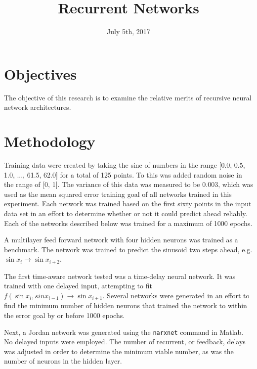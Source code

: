 \documentclass{IEEEtran}
\begin{document}
\title{Recurrent Networks}
\author{
}
\date{July 5th, 2017}

\maketitle

\section{Objectives\label{sn:objectives}}
The objective of this research is to examine the relative merits of recursive neural network architectures.

\section{Methodology\label{sn:methodology}}
Training data were created by taking the sine of numbers in the range [0.0, 0.5, 1.0, ..., 61.5, 62.0] for a total of 125 points. To this was added random noise in the range of [0, 1]. The variance of this data was measured to be 0.003, which was used as the mean squared error training goal of all networks trained in this experiment. Each network was trained based on the first sixty points in the input data set in an effort to determine whether or not it could predict ahead reliably. Each of the networks described below was trained for a maximum of 1000 epochs.

A multilayer feed forward network with four hidden neurons was trained as a benchmark. The network was trained to predict the sinusoid two steps ahead, e.g. $ \sin{x_i} \rightarrow \sin{x_{i+2}} $.

The first time-aware network tested was a time-delay neural network. It was trained with one delayed input, attempting to fit $ f\left(\sin{x_i}, sin{x_{i-1}}\right) \rightarrow \sin{x_{i+1}} $. Several networks were generated in an effort to find the minimum number of hidden neurons that trained the network to within the error goal by or before 1000 epochs.

Next, a Jordan network was generated using the \verb|narxnet| command in Matlab. No delayed inputs were employed. The number of recurrent, or feedback, delays was adjusted in order to determine the minimum viable number, as was the number of neurons in the hidden layer.
\end{document}
